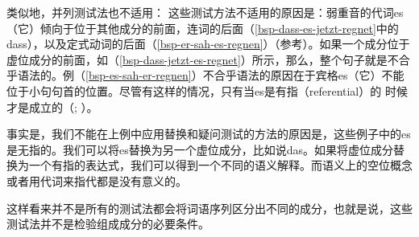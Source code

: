 \noindent
类似地，并列测试法也不适用：
\z
这些测试方法不适用的原因是：弱重音的代词es（它）倾向于位于其他成分的前面，连词的后面（\ref{bsp-dass-es-jetzt-regnet}中的dass），以及定式动词的后面（\ref{bsp-er-sah-es-regnen}）（参考\citealp[]{Abraham95a-u}）。如果一个成分位于虚位成分的前面，如（\ref{bsp-dass-jetzt-es-regnet}）所示，那么，整个句子就是不合乎语法的。例（\ref{bsp-es-sah-er-regnen}）不合乎语法的原因在于宾格es（它）不能位于小句句首的位置。尽管有这样的情况，只有当es是有指（referential）的 时候才是成立的（\citealt[]{Lenerz94a}; \citealp[]{GS97a}）。

事实是，我们不能在上例中应用替换和疑问测试的方法的原因是，这些例子中的es是无指的。我们可以将es替换为另一个虚位成分，比如说das。如果将虚位成分替换为一个有指的表达式，我们可以得到一个不同的语义解释。而语义上的空位概念或者用代词来指代都是没有意义的。

这样看来并不是所有的测试法都会将词语序列区分出不同的成分，也就是说，这些测试法并不是检验组成成分的必要条件。

